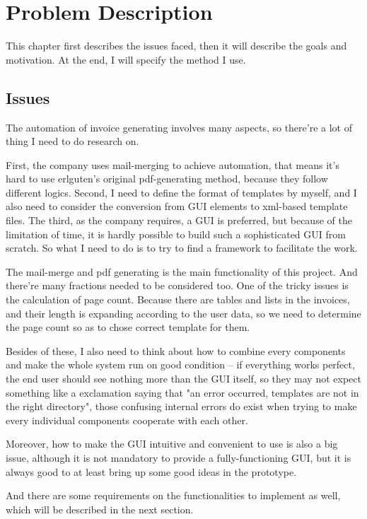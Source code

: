 \documentclass[12pt,twoside,a4paper]{report}
\begin{document}
\chapter{Problem Description}
  This chapter first describes the issues faced, then it will describe the goals and motivation. At the end, I will specify the method I use.

\section{Issues}
  The automation of invoice generating involves many aspects, so there're a lot of thing I need to do research on. 

  First, the company uses mail-merging to achieve automation, that means it's hard to use erlguten's original pdf-generating method, because they follow different logics. Second, I need to define the format of templates by myself, and I also need to consider the conversion from GUI elements to xml-based template files. The third, as the company requires, a GUI is preferred, but because of the limitation of time, it is hardly possible to build such a sophisticated GUI from scratch. So what I need to do is to try to find a framework to facilitate the work. 

  The mail-merge and pdf generating is the main functionality of this project. And there're many fractions needed to be considered too. One of the tricky issues is the calculation of page count. Because there are tables and lists in the invoices, and their length is expanding according to the user data, so we need to determine the page count so as to chose correct template for them. 

  Besides of these, I also need to think about how to combine every components and make the whole system run on good condition -- if everything works perfect, the end user should see nothing more than the GUI itself, so they may not expect something like a exclamation saying that "an error occurred, templates are not in the right directory", those confusing internal errors do exist when trying to make every individual components cooperate with each other.

  Moreover, how to make the GUI intuitive and convenient to use is also a big issue, although it is not mandatory to provide a fully-functioning GUI, but it is always good to at least bring up some good ideas in the prototype. 

  And there are some requirements on the functionalities to implement as well, which will be described in the next section.
\end{document}
